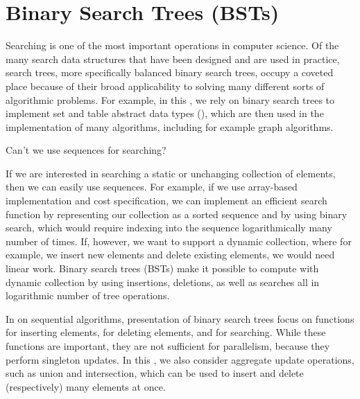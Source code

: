 \chapter{Binary Search Trees (BSTs)}
\label{ch:bst}


Searching is one of the most important operations in computer science.
Of the many search data structures that have been designed and are used
in practice, search trees, more specifically balanced binary search
trees, occupy a coveted place because of their broad applicability to
solving many different sorts of algorithmic problems.  For example, in
this \bc, we rely on binary search trees to implement set and table
abstract data types (), which are then used in the
implementation of many algorithms, including for example graph
algorithms.


\begin{question}
Can't we use sequences for searching? 
\end{question}
If we are interested in searching a static or unchanging collection of
elements, then we can easily use sequences.  For example, if we use
array-based implementation and cost specification, we can implement an
efficient search function by representing our collection as a sorted
sequence and by using binary search, which would require indexing into
the sequence logarithmically many number of times.
%
If, however, we want to support a dynamic collection, where for
example, we insert new elements and delete existing elements, we would
need linear work.
% 
Binary search trees (BSTs) make it possible to compute with dynamic
collection by using insertions, deletions, as well as searches all in
logarithmic number of tree operations.

In \bcs on sequential algorithms, presentation of binary search trees
focus on functions for inserting elements, for deleting elements, and
for searching.
%
While these functions are important, they are not sufficient for
parallelism, because they perform singleton updates. 
% 
In this \bc, we also consider aggregate update operations, 
such as union and intersection, which can be used to insert and delete (respectively) many elements at once.



